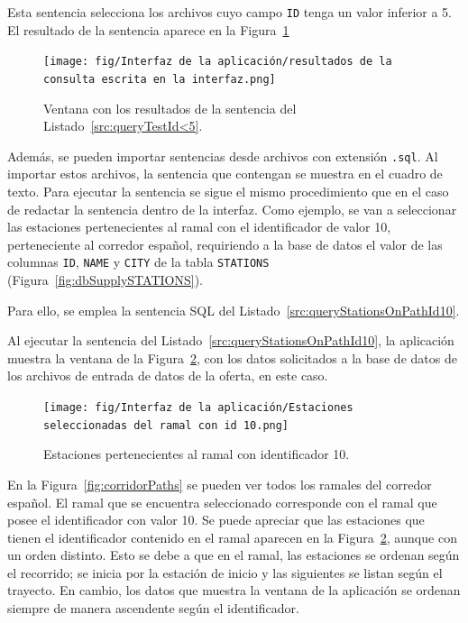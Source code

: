 Esta sentencia selecciona los archivos cuyo campo \texttt{ID} tenga un valor inferior a 5. El resultado de la sentencia aparece en la Figura~\ref{fig:queryTestid<5}

\begin{figure}[H]
    \centering
    \texttt{[image: fig/Interfaz de la aplicación/resultados de la consulta escrita en la interfaz.png]}
    \caption{Ventana con los resultados de la sentencia del Listado~\ref{src:queryTestId<5}.}
    \label{fig:queryTestid<5}
\end{figure}

Además, se pueden importar sentencias desde archivos con extensión \texttt{.sql}. Al importar estos archivos, la sentencia que contengan se muestra en el cuadro de texto. Para ejecutar la sentencia se sigue el mismo procedimiento que en el caso de redactar la sentencia dentro de la interfaz. Como ejemplo, se van a seleccionar las estaciones pertenecientes al ramal con el identificador de valor 10, perteneciente al corredor español, requiriendo a la base de datos el valor de las columnas \texttt{ID}, \texttt{NAME} y \texttt{CITY} de la tabla \texttt{STATIONS} (Figura~\ref{fig:dbSupplySTATIONS}).

Para ello, se emplea la sentencia \acrshort{SQL} del Listado~\ref{src:queryStationsOnPathId10}.



Al ejecutar la sentencia del Listado~\ref{src:queryStationsOnPathId10}, la aplicación muestra la ventana de la Figura~\ref{fig:resultsOfQueryStationsOnPathId10}, con los datos solicitados a la base de datos de los archivos de entrada de datos de la oferta, en este caso.

\begin{figure}[H]
    \centering
    \texttt{[image: fig/Interfaz de la aplicación/Estaciones seleccionadas del ramal con id 10.png]}
    \caption{Estaciones pertenecientes al ramal con identificador 10.}
    \label{fig:resultsOfQueryStationsOnPathId10}
\end{figure}

En la Figura~\ref{fig:corridorPaths} se pueden ver todos los ramales del corredor español. El ramal que se encuentra seleccionado corresponde con el ramal que posee el identificador con valor 10. Se puede apreciar que las estaciones que tienen el identificador contenido en el ramal aparecen en la Figura~\ref{fig:resultsOfQueryStationsOnPathId10}, aunque con un orden distinto. Esto se debe a que en el ramal, las estaciones se ordenan según el recorrido; se inicia por la estación de inicio y las siguientes se listan según el trayecto. En cambio, los datos que muestra la ventana de la aplicación se ordenan siempre de manera ascendente según el identificador.

